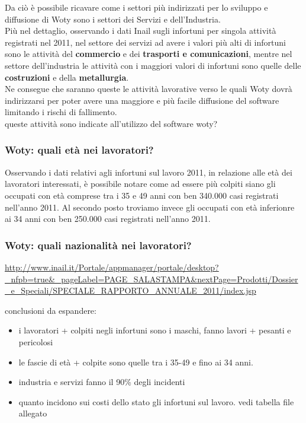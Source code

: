 Da ciò è possibile ricavare come i settori più indirizzati per lo sviluppo e diffusione di Woty sono i settori dei Servizi e dell'Industria.\\
Più nel dettaglio, osservando i dati Inail sugli infortuni per singola attività registrati nel 2011, nel settore dei servizi ad avere i valori più alti di infortuni sono le attività del \textbf{commercio} e dei \textbf{trasporti e comunicazioni}, mentre nel settore dell'industria le attività con i maggiori valori di infortuni sono quelle delle \textbf{costruzioni} e della \textbf{metallurgia}.\\
Ne consegue che saranno queste le attività lavorative verso le quali Woty dovrà indirizzarsi per poter avere una maggiore e più facile diffusione del software limitando i rischi di fallimento.\\


queste attività sono indicate all'utilizzo del software woty? 



\subsubsection{Woty: quali età nei lavoratori?}
Osservando i dati relativi agli infortuni sul lavoro 2011, in relazione alle età dei lavoratori interessati, è possibile notare come ad essere più colpiti siano gli occupati con età comprese tra i 35 e 49 anni con ben 340.000 casi registrati nell'anno 2011.
Al secondo posto troviamo invece gli occupati con età inferionre ai 34 anni con ben 250.000 casi registrati nell'anno 2011.\\



\subsubsection{Woty: quali nazionalità nei lavoratori?}



\url{http://www.inail.it/Portale/appmanager/portale/desktop?_nfpb=true&_pageLabel=PAGE_SALASTAMPA&nextPage=Prodotti/Dossier_e_Speciali/SPECIALE_RAPPORTO_ANNUALE_2011/index.jsp}





conclusioni da espandere:
\begin{itemize}
\item i lavoratori + colpiti negli infortuni sono i maschi, fanno lavori + pesanti e pericolosi
\item le fascie di età + colpite sono quelle tra i 35-49 e fino ai 34 anni.
\item industria e servizi fanno il 90\% degli incidenti
\item quanto incidono sui costi dello stato gli infortuni sul lavoro. vedi tabella file allegato
\end{itemize}







